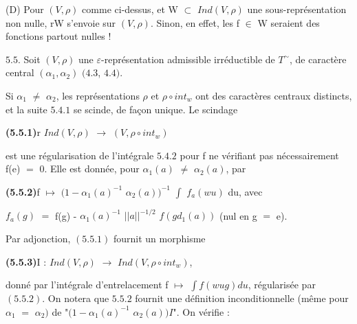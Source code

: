 \documentclass[10pt,a4paper]{article}
\begin{document}
\clearpage
{}
\label{d035-physical-023}
\par (D) Pour $(V,\rho{})$ comme ci-dessus, et W $\subset{}$ $Ind(V,\rho{})$ une sous-représentation non nulle, rW s'envoie sur $(V,\rho{})$. Sinon, en effet, les f $\in{}$ W seraient des fonctions partout nulles !\par
\par $5.5$. Soit $(V,\rho{})$ une $\varepsilon{}$-représentation admissible irréductible de $T^\sim$, de caractère central $(\alpha{}_1,\alpha{}_2)$ $(4.3$, $4.4)$.\par
\par Si $\alpha{}_1$ $\ne{}$ $\alpha{}_2$, les représentations $\rho{}$ et $\rho{}∘int_w$ ont des caractères centraux distincts, et la suite $5.4.1$ se scinde, de façon unique. Le scindage\par
\par\noindent\textbf{(5.5.1)}\quad r $Ind(V,\rho{})$ $\to{}$ $(V,\rho{}∘int_w)$\par
\par est une régularisation de l'intégrale $5.4.2$ pour f ne vérifiant pas nécessairement f(e) $=$ 0. Elle est donnée, pour $\alpha{}_1(a)$ $\ne{}$ $\alpha{}_2(a)$, par\par
\par\noindent\textbf{(5.5.2)}\quad f $\mapsto{}$ $(1-\alpha{}_1(a)^{-1}$ $\alpha{}_2(a))^{-1}$ $\int{}$ $f_a(wu)$ du, avec\par
\par\smallskip\begin{center}\begin{minipage}{0.96\textwidth}\centering
$f_a(g)$ $=$ f(g) - $\alpha{}_1(a)^{-1}$ $||a||^{-1/2}$ $f(gd_1(a))$ (nul en g $=$ e).
\end{minipage}\end{center}\smallskip
\par Par adjonction, $(5.5.1)$ fournit un morphisme\par
\par\noindent\textbf{(5.5.3)}\quad I : $Ind(V,\rho{})$ $\to{}$ $Ind(V,\rho{}∘int_w)$,\par
\par donné par l'intégrale d'entrelacement f $\mapsto{}$ $\int{}f(wug)du$, régularisée par $(5.5.2)$. On notera que $5.5.2$ fournit une définition inconditionnelle (même pour $\alpha{}_1$ $=$ $\alpha{}_2)$ de "$(1-\alpha{}_1(a)^{-1}$ $\alpha{}_2(a))I$". On vérifie :\par
\end{document}

